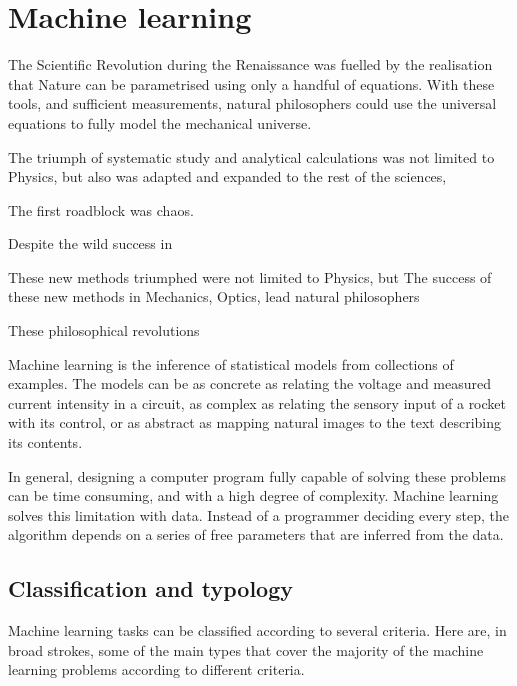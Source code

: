 \chapter{Machine learning}

The Scientific Revolution during the Renaissance was fuelled by the realisation that Nature can be parametrised using only a handful of equations.
With these tools, and sufficient measurements, natural philosophers could use the universal equations to fully model the mechanical universe.



The triumph of systematic study and analytical calculations was not limited to Physics, but also was adapted and expanded to the rest of the sciences, 

The first roadblock was chaos.

Despite the wild success in


These new methods triumphed were not limited to Physics, but 
The success of these new methods in Mechanics, Optics,  lead natural philosophers

These philosophical revolutions




Machine learning is the inference of statistical models from collections of examples.
The models can be as concrete as relating the voltage and measured current intensity in a circuit, as complex as relating the sensory input of a rocket with its control, or as abstract as mapping natural images to the text describing its contents.

In general, designing a computer program fully capable of solving these problems can be time consuming, and with a high degree of complexity.
Machine learning solves this limitation with data.
Instead of a programmer deciding every step, the algorithm depends on a series of free parameters that are inferred from the data.

\section{Classification and typology}
Machine learning tasks can be classified according to several criteria.
Here are, in broad strokes, some of the main types that cover the majority of the machine learning problems according to different criteria.

